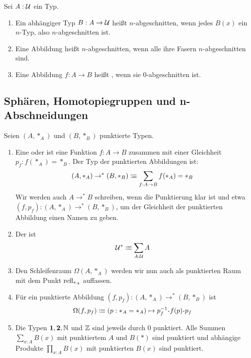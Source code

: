 \begin{definition}
  Sei $A:\mathcal{U}$ ein Typ.
  \begin{enumerate}
  \item Ein abhängiger Typ $B:A\to \mathcal{U}$ heißt $n$-abgeschnitten, wenn jedes $B(x)$ ein $n$-Typ, also $n$-abgeschnitten ist.
  \item Eine Abbildung heißt $n$-abgeschnitten, wenn alle ihre Fasern $n$-abgeschnitten sind.
  \item Eine Abbildung $f:A\to B$ heißt , wenn sie $0$-abgeschnitten ist.
  \end{enumerate}
\end{definition}

\subsection{Sphären, Homotopiegruppen und n-Abschneidungen}

\begin{definition}
  Seien $(A,\ast_A)$ und $(B,\ast_B)$ punktierte Typen.
  \begin{enumerate}
  \item Eine  oder \index{$\to^\ast$} ist eine Funktion $f:A\to B$ zusammen mit einer Gleichheit $p_f:f(\ast_A)=\ast_B$.
  Der Typ der punktierten Abbildungen ist:
  \[
    (A,\ast_A)\to^\ast (B,\ast_B)\vcentcolon\mspace{-1.2mu}\equiv  \sum_{f:A\to B}f(\ast_A)=\ast_B
  \]
  Wir werden auch $A\to^\ast B$ schreiben, wenn die Punktierung klar ist und etwa $(f,p_f):(A,\ast_A)\to^\ast (B,\ast_B)$, um der Gleichheit der punktierten Abbildung einen Namen zu geben.
\item Der  ist
  \[
    \mathcal{U}^\ast\vcentcolon\mspace{-1.2mu}\equiv\sum_{A:\mathcal{U}}A
  \]
\item Den Schleifenraum $\Omega(A,\ast_A)$ werden wir nun auch als punktierten Raum mit dem Punkt $\mathrm{refl}_{\ast_A}$ auffassen.
\item Für ein punktierte Abbildung $(f,p_f):(A,\ast_A)\to^\ast (B,\ast_B)$ ist
  \[
    \Omega(f,p_f) \colonequiv (p:\ast_A =\ast_A) \mapsto p_f^{-1}\kon f(p) \kon p_f
  \]
\item Die Typen $\mathbf{1},\mathbf{2},\mathbb{N}$ und $\mathbb{Z}$ sind jeweils durch $0$ punktiert. Alle Summen $\sum_{x:A}B(x)$ mit punktiertem $A$ und $B(\ast)$ sind punktiert und abhängige Produkte $\prod_{x:A}B(x)$ mit punktierten $B(x)$ sind punktiert.
  \end{enumerate}
\end{definition}

